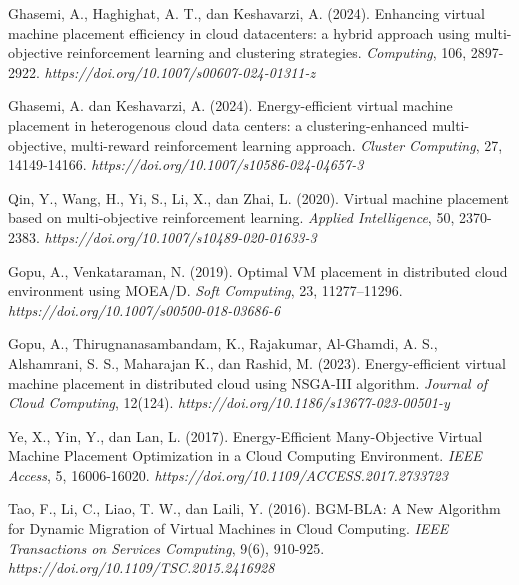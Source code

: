 \begin{thebibliography}{99}
	Ghasemi, A., Haghighat, A. T., dan Keshavarzi, A. (2024). Enhancing virtual machine placement efficiency in cloud datacenters: a hybrid approach using multi-objective reinforcement learning and clustering strategies. \textit{Computing}, 106, 2897-2922. \textit{https://doi.org/10.1007/s00607-024-01311-z}
	
	Ghasemi, A. dan Keshavarzi, A. (2024). Energy-efficient virtual machine placement in heterogenous cloud data centers: a clustering-enhanced multi-objective, multi-reward reinforcement learning approach. \textit{Cluster Computing}, 27, 14149-14166. \textit{https://doi.org/10.1007/s10586-024-04657-3}
	
	Qin, Y., Wang, H., Yi, S., Li, X., dan Zhai, L. (2020). Virtual machine placement based on multi-objective reinforcement learning. \textit{Applied Intelligence}, 50, 2370-2383. \textit{https://doi.org/10.1007/s10489-020-01633-3} 
	
	Gopu, A., Venkataraman, N. (2019). Optimal VM placement in distributed cloud environment using MOEA/D. \textit{Soft Computing}, 23, 11277–11296. \textit{https://doi.org/10.1007/s00500-018-03686-6}
	
	Gopu, A., Thirugnanasambandam, K., Rajakumar, Al-Ghamdi, A. S., Alshamrani, S. S., Maharajan K., dan Rashid, M. (2023). Energy-efficient virtual machine placement in distributed cloud using NSGA-III algorithm. \textit{Journal of Cloud Computing}, 12(124). \textit{https://doi.org/10.1186/s13677-023-00501-y} 
	
	Ye, X., Yin, Y., dan Lan, L. (2017). Energy-Efficient Many-Objective Virtual Machine Placement Optimization in a Cloud Computing Environment. \textit{IEEE Access}, 5, 16006-16020. \textit{https://doi.org/10.1109/ACCESS.2017.2733723}
	
	Tao, F., Li, C., Liao, T. W., dan Laili, Y. (2016). BGM-BLA: A New Algorithm for Dynamic Migration of Virtual Machines in Cloud Computing. \textit{IEEE Transactions on Services Computing}, 9(6), 910-925. \textit{https://doi.org/10.1109/TSC.2015.2416928}

\end{thebibliography}
